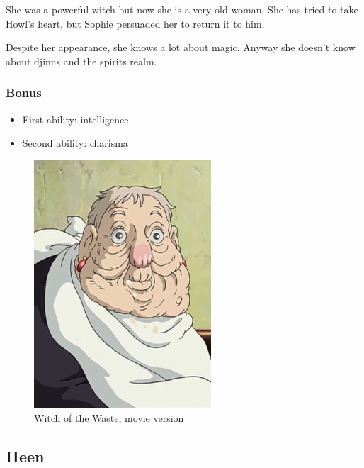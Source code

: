 \begin{minipage}[t]{0.5\textwidth}
She was a powerful witch but now she is a very old woman. She has tried to take Howl’s heart, but Sophie persuaded her to return it to him.

Despite her appearance, she knows a lot about magic. Anyway she doesn’t know about djinns and the spirits realm.

\subsubsection{Bonus}
\begin{itemize}
	\item First ability: intelligence
	\item Second ability: charisma
\end{itemize}

\end{minipage}%
%
\hfill
\begin{minipage}[t]{0.4\textwidth}
  \begin{figure}[H]
    \hfill\includegraphics{Images/Characters/witchOfTheWaste_portrait}
    \caption{Witch of the Waste, movie version}
  \end{figure}
\end{minipage}

\subsection{Heen}

